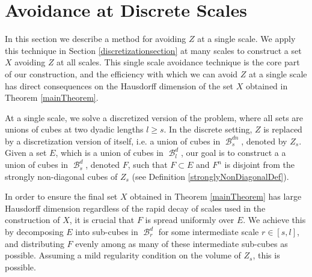 \documentclass[dvipsnames,letterpaper,12pt]{article}
\numberwithin{equation}{section}
\theoremstyle{plain}
\DeclareMathOperator{\B}{\mathcal{B}}
\begin{document}
\section{Avoidance at Discrete Scales}\label{discretesection}

In this section we describe a method for avoiding $Z$ at a single scale. We apply this technique in Section \ref{discretizationsection} at many scales to construct a set $X$ avoiding $Z$ at all scales. This single scale avoidance technique is the core part of our construction, and the efficiency with which we can avoid $Z$ at a single scale has direct consequences on the Hausdorff dimension of the set $X$ obtained in Theorem \ref{mainTheorem}.

At a single scale, we solve a discretized version of the problem, where all sets are unions of cubes at two dyadic lengths $l \geq s$. In the discrete setting, $Z$ is replaced by a discretization version of itself, i.e. a union of cubes in $\B^{dn}_s$, denoted by $Z_s$. Given a set $E$, which is a union of cubes in $\B_l^d$, our goal is to construct a a union of cubes in $\B_s^d$, denoted $F$, such that $F \subset E$ and $F^n$ is disjoint from the strongly non-diagonal cubes of $Z_s$ (see Definition \ref{stronglyNonDiagonalDef}).


In order to ensure the final set $X$ obtained in Theorem \ref{mainTheorem} has large Hausdorff dimension regardless of the rapid decay of scales used in the construction of $X$, it is crucial that $F$ is spread uniformly over $E$. We achieve this by decomposing $E$ into sub-cubes in $\B_r^d$ for some intermediate scale $r \in [s,l]$, and distributing $F$ evenly among as many of these intermediate sub-cubes as possible. Assuming a mild regularity condition on the volume of $Z_s$, this is possible.
\end{document}
